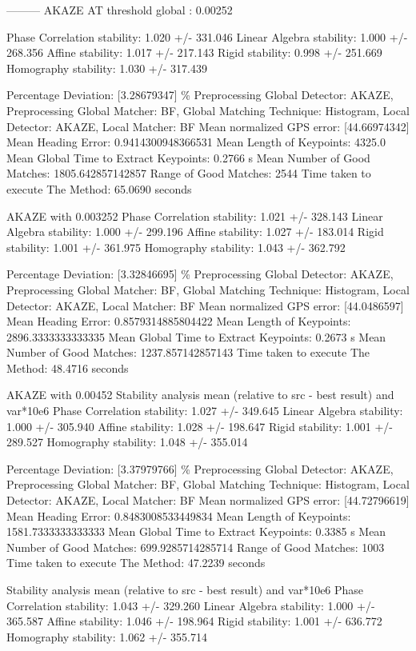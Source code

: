
--------- AKAZE
AT threshold global : 0.00252

Phase Correlation stability: 1.020 +/- 331.046
Linear Algebra stability: 1.000 +/- 268.356
Affine stability: 1.017 +/- 217.143
Rigid stability: 0.998 +/- 251.669
Homography stability: 1.030 +/- 317.439

Percentage Deviation: [3.28679347] \%
Preprocessing Global Detector: AKAZE, Preprocessing Global Matcher: BF, Global Matching Technique: Histogram, Local Detector: AKAZE, Local Matcher: BF
Mean normalized GPS error: [44.66974342]
 Mean Heading Error: 0.9414300948366531
Mean Length of Keypoints: 4325.0
Mean Global Time to Extract Keypoints: 0.2766 s
Mean Number of Good Matches: 1805.642857142857
Range of Good Matches: 2544
Time taken to execute The Method: 65.0690 seconds


AKAZE with 0.003252
Phase Correlation stability: 1.021 +/- 328.143
Linear Algebra stability: 1.000 +/- 299.196
Affine stability: 1.027 +/- 183.014
Rigid stability: 1.001 +/- 361.975
Homography stability: 1.043 +/- 362.792

Percentage Deviation: [3.32846695] \%
Preprocessing Global Detector: AKAZE, Preprocessing Global Matcher: BF, Global Matching Technique: Histogram, Local Detector: AKAZE, Local Matcher: BF
Mean normalized GPS error: [44.0486597]
 Mean Heading Error: 0.8579314885804422
Mean Length of Keypoints: 2896.3333333333335
Mean Global Time to Extract Keypoints: 0.2673 s
Mean Number of Good Matches: 1237.857142857143
Time taken to execute The Method: 48.4716 seconds




AKAZE with 0.00452
Stability analysis mean (relative to src - best result) and var*10e6
Phase Correlation stability: 1.027 +/- 349.645
Linear Algebra stability: 1.000 +/- 305.940
Affine stability: 1.028 +/- 198.647
Rigid stability: 1.001 +/- 289.527
Homography stability: 1.048 +/- 355.014

Percentage Deviation: [3.37979766] \%
Preprocessing Global Detector: AKAZE, Preprocessing Global Matcher: BF, Global Matching Technique: Histogram, Local Detector: AKAZE, Local Matcher: BF
Mean normalized GPS error: [44.72796619]
 Mean Heading Error: 0.8483008533449834
Mean Length of Keypoints: 1581.7333333333333
Mean Global Time to Extract Keypoints: 0.3385 s
Mean Number of Good Matches: 699.9285714285714
Range of Good Matches: 1003
Time taken to execute The Method: 47.2239 seconds


Stability analysis mean (relative to src - best result) and var*10e6
Phase Correlation stability: 1.043 +/- 329.260
Linear Algebra stability: 1.000 +/- 365.587
Affine stability: 1.046 +/- 198.964
Rigid stability: 1.001 +/- 636.772
Homography stability: 1.062 +/- 355.714

